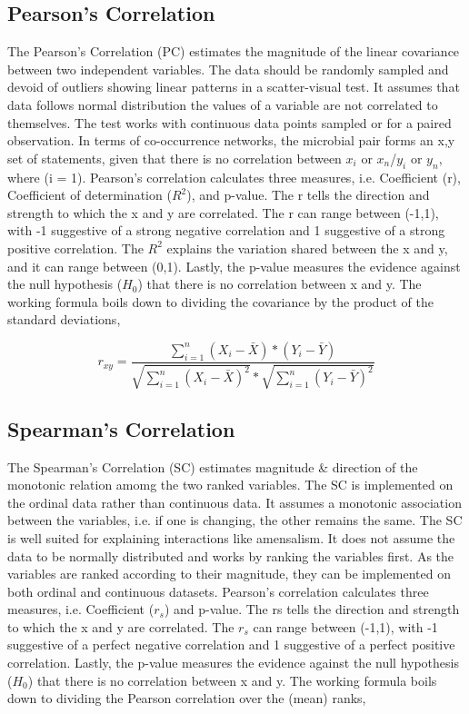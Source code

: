 \subsection{Pearson's Correlation }
The Pearson's Correlation (PC) estimates the magnitude of the linear covariance between two independent variables. The data should be randomly sampled and devoid of outliers showing linear patterns in a scatter-visual test. It assumes that data follows normal distribution the values of a variable are not correlated to themselves. The test works with continuous data points sampled or for a paired observation. In terms of co-occurrence networks, the microbial pair forms an {x,y} set of statements, given that there is no correlation between $x_{i}$ or $x_{n}$/$y_{i}$ or $y_{n}$, where (i = 1). Pearson's correlation calculates three measures, i.e. Coefficient (r), Coefficient of determination ($R^{2}$), and p-value. The r tells the direction and strength to which the x and y are correlated. The r can range between (-1,1), with -1 suggestive of a strong negative correlation and 1 suggestive of a strong positive correlation. The $R^{2}$ explains the variation shared between the x and y, and it can range between (0,1). Lastly, the p-value measures the evidence against the null hypothesis ($H_{0}$) that there is no correlation between x and y. The working formula boils down to dividing the covariance by the product of the standard deviations,

$$r_{xy} = \frac{\sum_{i=1}^{n} (X_{i} - \bar{X}) * (Y_{i} - \bar{Y})}{\sqrt{\sum_{i=1}^{n} (X_{i} - \bar{X})^{2}} * \sqrt{\sum_{i=1}^{n} (Y_{i} - \bar{Y})^{2}}}$$

\subsection{Spearman's Correlation}
The Spearman's Correlation (SC) estimates magnitude \& direction of the monotonic relation amomg the two ranked variables. The SC is implemented on the ordinal data rather than continuous data. It assumes a monotonic association between the variables, i.e. if one is changing, the other remains the same. The SC is well suited for explaining interactions like amensalism. It does not assume the data to be normally distributed and works by ranking the variables first. As the variables are ranked according to their magnitude, they can be implemented on both ordinal and continuous datasets. Pearson's correlation calculates three measures, i.e. Coefficient ($r_{s}$) and p-value. The rs tells the direction and strength to which the x and y are correlated. The $r_{s}$ can range between (-1,1), with -1 suggestive of a perfect negative correlation and 1 suggestive of a perfect positive correlation. Lastly, the p-value measures the evidence against the null hypothesis ($H_{0}$) that there is no correlation between x and y. The working formula boils down to dividing the Pearson correlation over the (mean) ranks,

